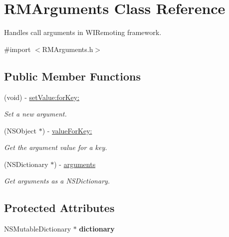 \hypertarget{interface_r_m_arguments}{
\section{RMArguments Class Reference}
\label{interface_r_m_arguments}
}


Handles call arguments in WIRemoting framework.  


{\ttfamily \#import $<$RMArguments.h$>$}\subsection*{Public Member Functions}
\begin{DoxyCompactItemize}
\item 
(void) -\/ \hyperlink{interface_r_m_arguments_a1e85072f47879b66ba598dabf2bbcf69}{setValue:forKey:}
\begin{DoxyCompactList}\small\item\em Set a new argument. \item\end{DoxyCompactList}\item 
(NSObject $\ast$) -\/ \hyperlink{interface_r_m_arguments_a7a9997955aea7ea469e7c94683b777e0}{valueForKey:}
\begin{DoxyCompactList}\small\item\em Get the argument value for a key. \item\end{DoxyCompactList}\item 
(NSDictionary $\ast$) -\/ \hyperlink{interface_r_m_arguments_a840dc27fd0f6266b79451b530b5a7f42}{arguments}
\begin{DoxyCompactList}\small\item\em Get arguments as a NSDictionary. \item\end{DoxyCompactList}\end{DoxyCompactItemize}
\subsection*{Protected Attributes}
\begin{DoxyCompactItemize}
\item 
\hypertarget{interface_r_m_arguments_ae8018072593b3c403fde9f03ff8e0e7a}{
NSMutableDictionary $\ast$ {\bfseries dictionary}}
\label{interface_r_m_arguments_ae8018072593b3c403fde9f03ff8e0e7a}

\end{DoxyCompactItemize}



